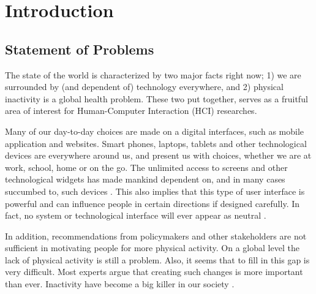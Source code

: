 \chapter{Introduction} 


\section{Statement of Problems}

The state of the world is characterized by two major facts right now; 1) we are surrounded by (and dependent of) technology everywhere, and 2) physical inactivity is a global health problem. These two put together, serves as a fruitful area of interest for Human-Computer Interaction (HCI) researches. 

Many of our day-to-day choices are made on a digital interfaces, such as mobile application and websites. Smart phones, laptops, tablets and other technological devices are everywhere around us, and present us with choices, whether we are at work, school, home or on the go. The unlimited access to screens and other technological widgets has made mankind dependent on, and in many cases succumbed to, such devices \cite{mirsch_digital_2017}.
This also implies that this type of user interface is powerful and can influence people in certain directions if designed carefully.  In fact, no system or technological interface will ever appear as neutral 
\cite{oinas-kukkonen_persuasive_2009}. 

In addition, recommendations from policymakers and other stakeholders are not sufficient in motivating people for more physical activity. On a global level the lack of physical activity is still a problem. Also, it seems that to fill in this gap is very difficult. Most experts argue that creating such changes is more important than ever. Inactivity have become a big killer in our society \cite{kohl_pandemic_2012}.

